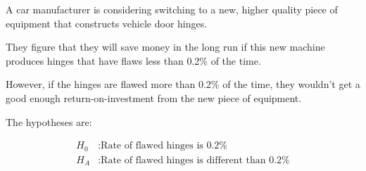 \documentclass{beamer}
\begin{document}
\begin{frame}
  \begin{example}
    A car manufacturer is considering switching to a new, higher quality piece of equipment that constructs vehicle door hinges.\pause

    \vspace{1mm}
    They figure that they will save money in the long run if this new machine produces hinges that have flaws less than 0.2\% of the time.\pause

    \vspace{1mm}
    However, if the hinges are flawed more than 0.2\% of the time, they wouldn't get a good enough return-on-investment from the new piece of equipment.\pause

    \vspace{1mm}
    The hypotheses are:

    \vspace{-2mm}
    \begin{equation*}
      \begin{aligned}
        H_0 &: \text{Rate of flawed hinges is 0.2\%} \\
        H_A &: \text{Rate of flawed hinges is different than 0.2\%}
      \end{aligned}
    \end{equation*}\pause
    
    \vspace{-2mm}
    \pause
  \end{example}
\end{frame}
\end{document}
